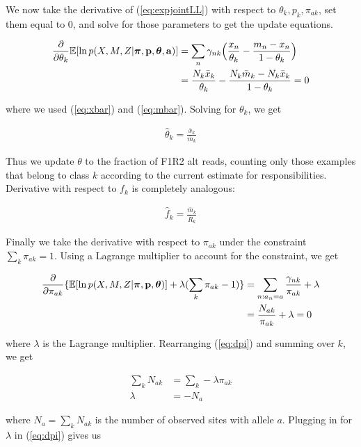 \documentclass[a4paper]{article}
\newcommand{\va}{{\bf a}}
\newcommand{\vp}{{\bf p}}
\newcommand{\vpi}{{\bm \pi}}
\newcommand{\vtheta}{{\bm \theta}}
\newcommand{\E}{\mathbb{E}}
\begin{document}
We now take the derivative of (\ref{eq:expjointLL}) with respect to $\theta_k, p_k, \pi_{ak}$, set them equal to 0, and solve for those parameters to get the update equations.

\begin{align}
\frac{\partial}{\partial \theta_k} \E [ \ln p(X, M , Z | \vpi, \vp, \vtheta, \va) ] &= \sum_n \gamma_{nk} \Big( \frac{ x_n}{\theta_k} - \frac{m_n - x_n}{1- \theta_k} \Big)\\
					         							     &= \frac{N_k \bar{x}_k}{\theta_k} - \frac{N_k \bar{m}_k - N_k \bar{x}_k}{1- \theta_k} = 0
\end{align}

where we used (\ref{eq:xbar}) and (\ref{eq:mbar}). Solving for $\theta_k$, we get

\begin{align}
\hat{\theta}_k = \frac{\bar{x}_k}{\bar{m}_k} \label{eq:theta}
\end{align}

Thus we update $\theta$ to the fraction of F1R2 alt reads, counting only those examples that belong to class $k$ according to the current estimate for responsibilities. Derivative with respect to $f_k$ is completely analogous:

\begin{align}
\hat{f}_k = \frac{\bar{m}_k}{\bar{R}_k} \label{eq:f}
\end{align}

Finally we take the derivative with respect to $\pi_{ak}$ under the constraint $\sum_k \pi_{ak} = 1$. Using a Lagrange multiplier to account for the constraint, we get

\begin{align}
\frac{\partial}{\partial \pi_{ak}} \{ \E [ \ln p(X, M , Z | \vpi, \vp, \vtheta) ] + \lambda ( \sum_k \pi_{ak} - 1)\} &= \sum_{n : a_n = a} \frac{\gamma_{nk}}{\pi_{ak}} + \lambda \nonumber \\
																   &= \frac{N_{ak}}{\pi_{ak}} + \lambda = 0 \label{eq:dpi}
\end{align}

where $\lambda$ is the Lagrange multiplier. Rearranging (\ref{eq:dpi}) and summing over $k$, we get

\begin{align*}
\sum_k N_{ak} &= \sum_k - \lambda \pi_{ak} \\
      \lambda &= - N_a 
\end{align*}

where $N_a = \sum_k N_{ak} $ is the number of observed sites with allele $a$. Plugging in for $\lambda$ in (\ref{eq:dpi}) gives us
\end{document}
